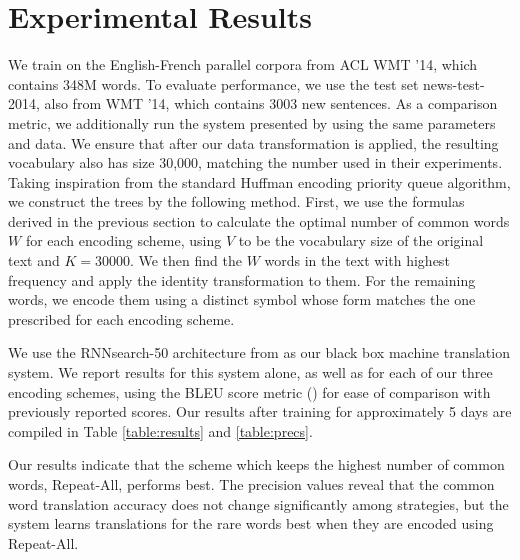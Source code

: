 \section{Experimental Results}
\label{sec:exp}

We train on the English-French parallel corpora from ACL WMT '14, which contains
348M words. To evaluate performance, we use the test set news-test-2014, also from
WMT '14, which contains 3003 new sentences. As a comparison metric, we additionally run the system presented by
 using the same parameters and data. We ensure
that after our data transformation is applied, the resulting vocabulary also has size
30,000, matching the number used in their experiments. Taking inspiration from the standard Huffman encoding
priority queue algorithm, we construct the trees by the following method. First, we use
the formulas derived in the previous section to calculate the optimal number of
common words $W$ for each encoding scheme, using $V$ to be the vocabulary size of the original text and $K = 30000$.
We then find the $W$ words in the text with highest frequency and
apply the identity transformation to them. For the remaining words, we encode them
using a distinct symbol whose form matches the one prescribed for each
encoding scheme.

We use the RNNsearch-50 architecture from  as
our black box machine translation system. We report results for this system alone,
as well as for each of our three encoding schemes, using the BLEU score metric () for
ease of comparison with previously reported scores. Our results after training
for approximately 5 days are compiled in Table \ref{table:results} and \ref{table:precs}.

Our results indicate that the scheme which keeps the highest number of common words, Repeat-All,
performs best. The precision values reveal that the common word translation accuracy does not change significantly
among strategies, but the system learns translations for the rare words best when they are encoded
using Repeat-All.

\begin{table}
  \centering
  \vspace{8pt}
  \caption{BLEU scores on detokenized test set for various encoding
    schemes after training for 5 days.}
  \label{table:results}
\end{table}


